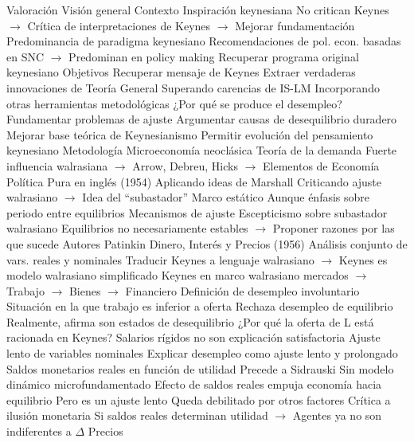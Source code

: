 \documentclass{nuevotema}
\begin{document}
\begin{esquemal}
				\4 Valoración
	\1 
		\2 Visión general
			\3 Contexto
				\4 Inspiración keynesiana
				\4 No critican Keynes
				\4[] $\to$ Crítica de interpretaciones de Keynes
				\4[] $\to$ Mejorar fundamentación
				\4 Predominancia de paradigma keynesiano
				\4[] Recomendaciones de pol. econ. basadas en SNC
				\4[] $\to$ Predominan en policy making
				\4 Recuperar programa original keynesiano
			\3 Objetivos
				\4 Recuperar mensaje de Keynes
				\4[] Extraer verdaderas innovaciones de Teoría General
				\4[] Superando carencias de IS-LM
				\4[] Incorporando otras herramientas metodológicas
				\4 ¿Por qué se produce el desempleo?
				\4[] Fundamentar problemas de ajuste
				\4[] Argumentar causas de desequilibrio duradero
				\4[$\then$] Mejorar base teórica de Keynesianismo
				\4[$\then$] Permitir evolución del pensamiento keynesiano
			\3 Metodología
				\4 Microeconomía neoclásica
				\4[] Teoría de la demanda
				\4[] Fuerte influencia walrasiana
				\4[] $\to$ Arrow, Debreu, Hicks
				\4[] $\to$ Elementos de Economía Política Pura en inglés (1954)
				\4[] Aplicando ideas de Marshall
				\4[] Criticando ajuste walrasiano
				\4[] $\to$ Idea del ``subastador''
				\4 Marco estático
				\4[] Aunque énfasis sobre periodo entre equilibrios
				\4 Mecanismos de ajuste
				\4[] Escepticismo sobre subastador walrasiano
				\4[] Equilibrios no necesariamente estables
				\4[] $\to$ Proponer razones por las que sucede
		\2 Autores
			\3 Patinkin
				\4 Dinero, Interés y Precios (1956)
				\4[] Análisis conjunto de vars. reales y nominales
				\4[] Traducir Keynes a lenguaje walrasiano
				\4[] $\to$ Keynes es modelo walrasiano simplificado
				\4 Keynes en marco walrasiano
				 mercados
				\4[] $\to$ Trabajo
				\4[] $\to$ Bienes
				\4[] $\to$ Financiero
				\4 Definición de desempleo involuntario
				\4[] Situación en la que trabajo es inferior a oferta
				\4 Rechaza desempleo de equilibrio
				\4[] Realmente, afirma son estados de desequilibrio
				\4 ¿Por qué la oferta de L está racionada en Keynes?
				\4[] Salarios rígidos no son explicación satisfactoria
				\4 Ajuste lento de variables nominales
				\4[] Explicar desempleo como ajuste lento y prolongado
				\4 Saldos monetarios reales en función de utilidad
				\4[] Precede a Sidrauski
				\4[] Sin modelo dinámico microfundamentado
				\4 Efecto de saldos reales empuja economía hacia equilibrio
				\4[] Pero es un ajuste lento
				\4[] Queda debilitado por otros factores
				\4 Crítica a ilusión monetaria
				\4[] Si saldos reales determinan utilidad
				\4[] $\to$ Agentes ya no son indiferentes a $\Delta$ Precios

\end{esquemal}
\end{document}
